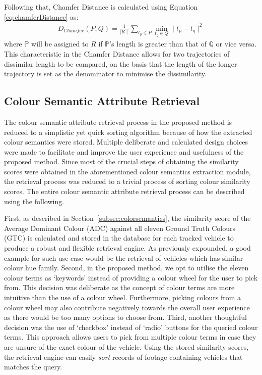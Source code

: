 Following that, Chamfer Distance is calculated using Equation
\ref{eq:chamferDistance} as:
\begin{align}
\label{eq:chamferDistance}
D_{Chamfer} (P,Q) = \frac{1}{\mid R \mid} \sum_{t_p \in P} \min_{t_q \in Q}  \mid t_p - t_q \mid^{2}
\end{align}
where $\mathbb{P}$ will be assigned to $R$ if $\mathbb{P}$'s length is greater than that of $\mathbb{Q}$ or vice versa. This characteristic in the Chamfer Distance allows for two trajectories of dissimilar length to be compared, on the basis that the length of the longer trajectory is set as the denominator to minimise the dissimilarity. 

\subsection{Colour Semantic Attribute Retrieval}
\label{section:colourretrieval}

The colour semantic attribute retrieval process in the proposed method is reduced to a simplistic yet quick sorting algorithm because of how the extracted colour semantics were stored. 
Multiple deliberate and calculated design choices were made to facilitate and improve the user experience and usefulness of the proposed method.
Since most of the crucial steps of obtaining the similarity scores were obtained in the aforementioned colour semantics extraction module, the retrieval process was reduced to a trivial process of sorting colour similarity scores. 
The entire colour semantic attribute retrieval process can be described using the following.

First, as described in Section~\ref{subsec:colorsemantics}, the similarity score of the Average Dominant Colour (ADC) against all eleven Ground Truth Colours (GTC) is calculated and stored in the database for each tracked vehicle to produce a robust and flexible retrieval engine.
As previously expounded, a good example for such use case would be the retrieval of vehicles which has similar colour hue family. 
Second, in the proposed method, we opt to utilise the eleven colour terms as `keywords' instead of providing a colour wheel for the user to pick from. 
This decision was deliberate as the concept of colour terms are more intuitive than the use of a colour wheel.
Furthermore, picking colours from a colour wheel may also contribute negatively towards the overall user experience as there would be too many options to choose from. 
Third, another thoughtful decision was the use of `checkbox' instead of `radio' buttons for the queried colour terms.
This approach allows users to pick from multiple colour terms in case they are unsure of the exact colour of the vehicle.
Using the stored similarity scores, the retrieval engine can easily \emph{sort} records of footage containing vehicles that matches the query. 

